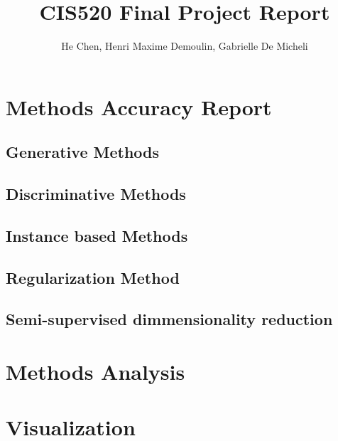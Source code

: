 \documentclass[11pt,twocolumn]{report}
\author{He Chen, Henri Maxime Demoulin, Gabrielle De Micheli}
\title{CIS520 Final Project Report}
\begin{document}
\maketitle

\section{Methods Accuracy Report}

    \subsection{Generative Methods}
    \subsection{Discriminative Methods}
    \subsection{Instance based Methods}
    \subsection{Regularization Method}
    \subsection{Semi-supervised dimmensionality reduction}

\section{Methods Analysis}

\section{Visualization}
\end{document}
